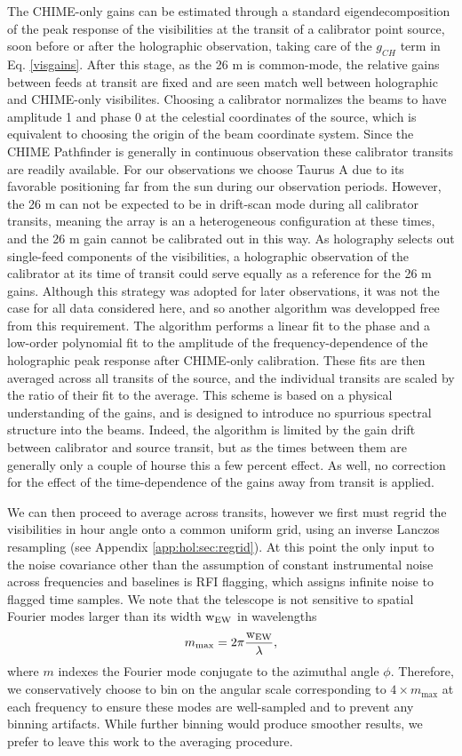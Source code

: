 The CHIME-only gains can be estimated through a standard eigendecomposition of the peak response of the visibilities at the transit of a calibrator point source, soon before or after the holographic observation, taking care of the $g_{CH}$ term in Eq. \ref{visgains}. After this stage, as the 26 m is common-mode, the relative gains between feeds at transit are fixed and are seen match well between holographic and CHIME-only visibilites. Choosing a calibrator normalizes the beams to have amplitude 1 and phase 0 at the celestial coordinates of the source, which is equivalent to choosing the origin of the beam coordinate system. Since the CHIME Pathfinder is generally in continuous observation these calibrator transits are readily available. For our observations we choose Taurus A due to its favorable positioning far from the sun during our observation periods. However, the 26 m can not be expected to be in drift-scan mode during all calibrator transits, meaning the array is an a heterogeneous configuration at these times, and the 26 m gain cannot be calibrated out in this way. As holography selects out single-feed components of the visibilities, a holographic observation of the calibrator at its time of transit could serve equally as a reference for the 26 m gains. Although this strategy was adopted for later observations, it was not the case for all data considered here, and so another algorithm was developped free from this requirement. The algorithm performs a linear fit to the phase and a low-order polynomial fit to the amplitude of the frequency-dependence of the holographic peak response after CHIME-only calibration. These fits are then averaged across all transits of the source, and the individual transits are scaled by the ratio of their fit to the average. This scheme is based on a physical understanding of the gains, and is designed to introduce no spurrious spectral structure into the beams. Indeed, the algorithm is limited by the gain drift between calibrator and source transit, but as the times between them are generally only a couple of hourse this a few percent effect. As well, no correction for the effect of the time-dependence of the gains away from transit is applied.

We can then proceed to average across transits, however we first must regrid the visibilities in hour angle onto a common uniform grid, using an inverse Lanczos resampling (see Appendix \ref{app:hol:sec:regrid}). At this point the only input to the noise covariance other than the assumption of constant instrumental noise across frequencies and baselines is RFI flagging, which assigns infinite noise to flagged time samples. We note that the telescope is not sensitive to spatial Fourier modes larger than its width ${\rm w_{EW}}$ in wavelengths
\begin{equation}
m_{\rm max} = 2\pi \frac{\rm w_{EW}}{\lambda},
\end{equation}
where $m$ indexes the Fourier mode conjugate to the azimuthal angle $\phi$. Therefore, we conservatively choose to bin on the angular scale corresponding to $4\times m_{\max}$ at each frequency to ensure these modes are well-sampled and to prevent any binning artifacts. While further binning would produce smoother results, we prefer to leave this work to the averaging procedure. 

